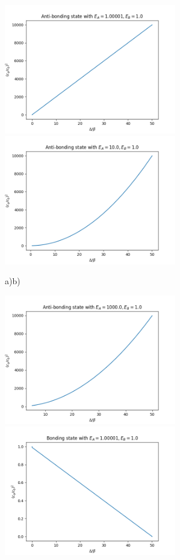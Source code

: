 \begin{questions}
\begin{solution}
\includegraphics[width=75mm]{anti-1-mal.png}
\includegraphics[width=75mm]{anti-10-mal.png}

\hspace{3.6cm}a)\hspace{7.5cm}b)

\includegraphics[width=75mm]{anti-1000-mal.png}
\includegraphics[width=75mm]{bond-1-mal.png}


\end{solution}
\end{questions}

